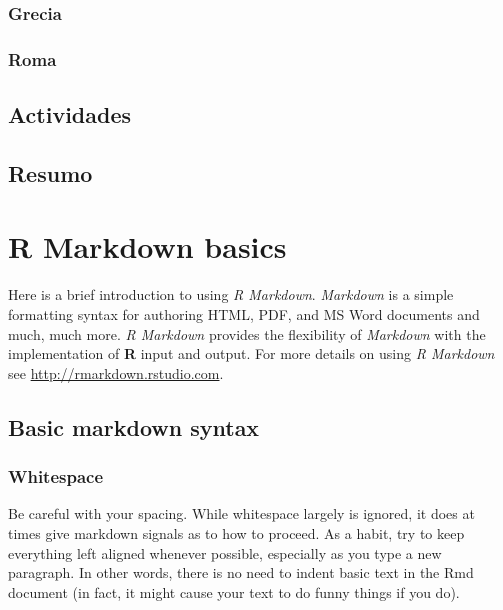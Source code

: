 \documentclass[a4paper, twoside]{templates/ociamthesis}
\begin{document}
\hypertarget{grecia}{%
\subsection{Grecia}\label{grecia}}

\hypertarget{roma}{%
\subsection{Roma}\label{roma}}

\hypertarget{actividades}{%
\section{Actividades}\label{actividades}}

\hypertarget{resumo}{%
\section{Resumo}\label{resumo}}

\hypertarget{rmd-basics}{%
\chapter{R Markdown basics}\label{rmd-basics}}

\minitoc 

\noindent Here is a brief introduction to using \emph{R Markdown}.
\emph{Markdown} is a simple formatting syntax for authoring HTML, PDF, and MS Word documents and much, much more.
\emph{R Markdown} provides the flexibility of \emph{Markdown} with the implementation of \textbf{R} input and output. For more details on using \emph{R Markdown} see \url{http://rmarkdown.rstudio.com}.

\hypertarget{basic-markdown-syntax}{%
\section{Basic markdown syntax}\label{basic-markdown-syntax}}

\hypertarget{whitespace}{%
\subsection{Whitespace}\label{whitespace}}

Be careful with your spacing.
While whitespace largely is ignored, it does at times give markdown signals as to how to proceed.
As a habit, try to keep everything left aligned whenever possible, especially as you type a new paragraph.
In other words, there is no need to indent basic text in the Rmd document (in fact, it might cause your text to do funny things if you do).
\end{document}
